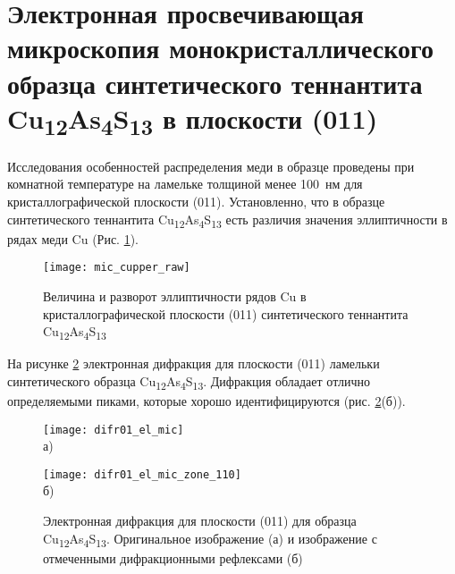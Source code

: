 \section{Электронная просвечивающая микроскопия монокристаллического образца синтетического теннантита Cu\textsubscript{12}As\textsubscript{4}S\textsubscript{13} в плоскости (011) } \label{sect3_2}

Исследования особенностей распределения меди в образце проведены при комнатной температуре на ламельке толщиной менее 100~нм для кристаллографической плоскости (011). 
Установленно, что в образце синтетического теннантита Cu\textsubscript{12}As\textsubscript{4}S\textsubscript{13} есть различия значения эллиптичности в рядах меди Cu (Рис. \ref{img:mic}).

\begin{figure}[h!]
  \begin{minipage}[ht]{0.9\linewidth}\centering
    \texttt{[image: mic\_cupper\_raw]}
  \end{minipage}

      \caption[Величина и разворот эллиптичности рядов Cu в кристаллографической плоскости (011) синтетического теннантита Cu\textsubscript{12}As\textsubscript{4}S\textsubscript{13}]{Величина и разворот эллиптичности рядов Cu в кристаллографической плоскости (011) синтетического теннантита Cu\textsubscript{12}As\textsubscript{4}S\textsubscript{13}}
    \label{img:mic}
\end{figure}


На рисунке \ref{img:mic2} электронная дифракция для плоскости (011) ламельки синтетического образца Cu\textsubscript{12}As\textsubscript{4}S\textsubscript{13}. 
Дифракция обладает отлично определяемыми пиками, которые хорошо идентифицируются (рис. \ref{img:mic2}(б)).

\begin{figure}[ph!]
\centering
  \begin{minipage}[ht]{0.7\linewidth}\centering
    \texttt{[image: difr01\_el\_mic]} \\ а)
  \end{minipage}
  \vfill
  \begin{minipage}[ht]{0.7\linewidth}\centering
    \texttt{[image: difr01\_el\_mic\_zone\_110]} \\ б)
  \end{minipage}
  \caption[Электронная дифракция для плоскости (011) для образца Cu\textsubscript{12}As\textsubscript{4}S\textsubscript{13}. Оригинальное изображение (а) и изображение с отмеченными дифракционными рефлексами (б)]{Электронная дифракция для плоскости (011) для образца Cu\textsubscript{12}As\textsubscript{4}S\textsubscript{13}. Оригинальное изображение (а) и изображение с отмеченными дифракционными рефлексами (б)}
    \label{img:mic2}
\end{figure}

